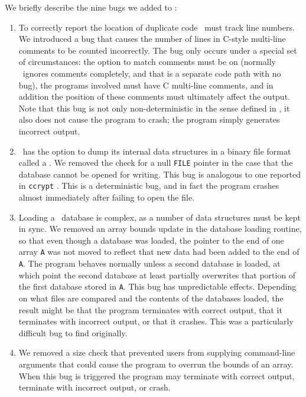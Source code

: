 We briefly describe the nine bugs we added to \moss:
\begin{enumerate}
\item To correctly report the location of duplicate code \moss\ must
track line numbers.  We introduced a bug that causes the number of
lines in C-style multi-line comments to be counted incorrectly.  The
bug only occurs under a special set of circumstances: the option to
match comments must be on (normally \moss\ ignores comments
completely, and that is a separate code path with no bug), the
programs involved must have C multi-line comments, and in addition the
position of these comments must ultimately affect the output.
Note that this bug is not only non-deterministic in
the sense defined in , it also does not
cause the program to crash; the program simply generates incorrect
output.

\item \moss\ has the option to dump its internal data structures in a
binary file format called a .  We removed the check for a
null {\tt FILE} pointer in the case that the database cannot be opened
for writing.  This bug is analogous to one reported in {\tt ccrypt}
\cite{Selinger:2003:cqual}.  This is a deterministic bug, and in fact the
program crashes almost immediately after failing to open the file.

\item Loading a \moss\ database is complex, as a number of data
structures must be kept in sync.  We removed an array bounds update
in the database loading routine, so that even though a database was
loaded, the pointer to the end of one array {\tt A} was not moved to
reflect that new data had been added to the end of {\tt A}. The
program behaves normally unless a second database is loaded, at which
point the second database at least partially overwrites that portion
of the first database stored in {\tt A}.  This bug has unpredictable
effects.  Depending on what files are compared and the contents of the
databases loaded, the result might be that the program terminates with
correct output, that it terminates with incorrect output, or that it
crashes.  This was a particularly difficult bug to find originally.

\item We removed a size check that prevented users from supplying command-line arguments
that could cause the program to overrun the bounds of an array.  When
this bug is triggered the program may terminate with correct output,
terminate with incorrect output, or crash.


\end{enumerate}
